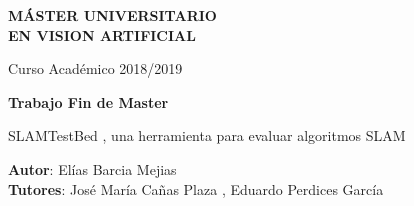 \thispagestyle{empty}
\vspace{5cm}


\begin{center}
  {\large {\bf MÁSTER UNIVERSITARIO\\ EN VISION ARTIFICIAL}}
  \vspace{5mm}
 
  {\large {Curso Académico 2018/2019}}

  \vspace{2cm}

  {\large {\bf  Trabajo Fin de Master}}

  \vspace{3cm}

  {\Large {{\Huge { SLAMTestBed , una herramienta para evaluar algoritmos SLAM }} \\[1cm] }}




  \vspace{5cm}
  {\bf Autor}: Elías Barcia Mejias\\
  {\bf Tutores}: José María Cañas Plaza , Eduardo Perdices García
\end{center}
